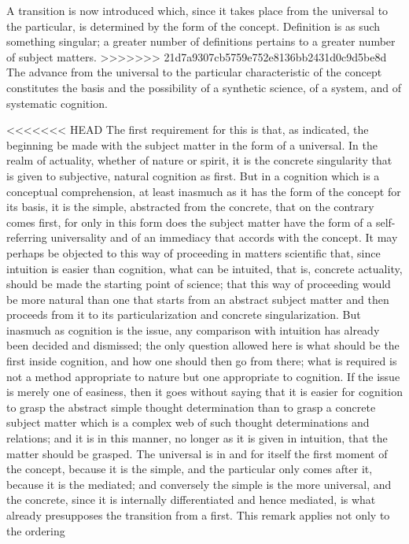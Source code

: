 A transition is now introduced which,
since it takes place from the universal to the particular,
is determined by the form of the concept.
Definition is as such something singular;
a greater number of definitions pertains to
a greater number of subject matters.
>>>>>>> 21d7a9307cb5759e752e8136bb2431d0c9d5be8d
The advance from the universal to the particular
characteristic of the concept constitutes
the basis and the possibility of a synthetic science,
of a system, and of systematic cognition.

<<<<<<< HEAD
The first requirement for this is that, as indicated, the beginning be made
with the subject matter in the form of a universal.
In the realm of actuality,
whether of nature or spirit, it is the concrete singularity that is given to
subjective, natural cognition as first.
But in a cognition which is a conceptual comprehension,
at least inasmuch as it has the form of the concept
for its basis, it is the simple, abstracted from the concrete,
that on the contrary comes first,
 for only in this form does the subject matter have
the form of a self-referring universality and of an immediacy that accords
with the concept.
It may perhaps be objected to this way of proceeding
in matters scientific that, since intuition is easier than cognition, what can
be intuited, that is, concrete actuality, should be made the starting point
of science; that this way of proceeding would be more natural than one
that starts from an abstract subject matter and then proceeds from it to its
particularization and concrete singularization.
But inasmuch as cognition
is the issue, any comparison with intuition has already been decided and
dismissed; the only question allowed here is what should be the first inside
cognition, and how one should then go from there; what is required is not
a method appropriate to nature but one appropriate to cognition.
If the
issue is merely one of easiness, then it goes without saying that it is easier
for cognition to grasp the abstract simple thought determination than to
grasp a concrete subject matter which is a complex web of such thought
determinations and relations; and it is in this manner, no longer as it is
given in intuition, that the matter should be grasped. The universal is in
and for itself the first moment of the concept, because it is the simple,
and the particular only comes after it, because it is the mediated; and
conversely the simple is the more universal, and the concrete, since it is
internally differentiated and hence mediated, is what already presupposes
the transition from a first.
This remark applies not only to the ordering
